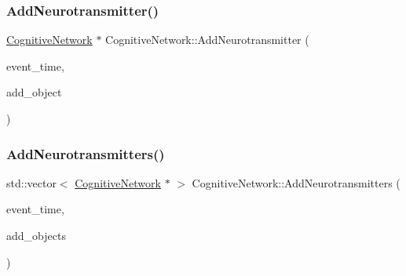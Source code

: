 \mbox{\label{classCognitiveNetwork_ab80ffdc75ad4754463c356d36fb81ab4}} 
\subsubsection{\texorpdfstring{Add\+Neurotransmitter()}{AddNeurotransmitter()}}
{\footnotesize\ttfamily \mbox{\hyperlink{classCognitiveNetwork}{Cognitive\+Network}} $\ast$ Cognitive\+Network\+::\+Add\+Neurotransmitter (\begin{DoxyParamCaption}\item[{std\+::chrono\+::time\+\_\+point$<$ \mbox{\hyperlink{universe_8h_a0ef8d951d1ca5ab3cfaf7ab4c7a6fd80}{Clock}} $>$}]{event\+\_\+time,  }\item[{\mbox{\hyperlink{classCognitiveNetwork}{Cognitive\+Network}} $\ast$}]{add\+\_\+object }\end{DoxyParamCaption})}

\mbox{\label{classCognitiveNetwork_a085f61ab94b71406a0a5e11d789ed69c}} 
\subsubsection{\texorpdfstring{Add\+Neurotransmitters()}{AddNeurotransmitters()}}
{\footnotesize\ttfamily std\+::vector$<$ \mbox{\hyperlink{classCognitiveNetwork}{Cognitive\+Network}} $\ast$ $>$ Cognitive\+Network\+::\+Add\+Neurotransmitters (\begin{DoxyParamCaption}\item[{std\+::chrono\+::time\+\_\+point$<$ \mbox{\hyperlink{universe_8h_a0ef8d951d1ca5ab3cfaf7ab4c7a6fd80}{Clock}} $>$}]{event\+\_\+time,  }\item[{std\+::vector$<$ \mbox{\hyperlink{classCognitiveNetwork}{Cognitive\+Network}} $\ast$$>$}]{add\+\_\+objects }\end{DoxyParamCaption})}

\mbox{\label{classCognitiveNetwork_ab6caa285c25568259ae935cf9e746af4}} 
